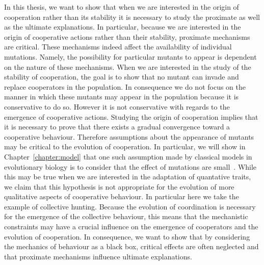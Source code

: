     In this thesis, we want to show that when we are interested in the origin of cooperation rather than its stability it is necessary to study the proximate as well as the ultimate explanations. In particular, because we are interested in the origin of cooperative actions rather than their stability, proximate mechanisms are critical. These mechanisms indeed affect the availability of individual mutations. Namely, the possibility for particular mutants to appear is dependent on the nature of these mechanisms. When we are interested in the study of the stability of cooperation, the goal is to show that no mutant can invade and replace cooperators in the population. In consequence we do not focus on the manner in which these mutants may appear in the population because it is conservative to do so. However it is not conservative with regards to the emergence of cooperative actions. Studying the origin of cooperation implies that it is necessary to prove that there exists a gradual convergence toward a cooperative behaviour. Therefore assumptions about the appearance of mutants may be critical to the evolution of cooperation. In particular, we will show in Chapter~\ref{chapter:model} that one such assumption made by classical models in evolutionary biology is to consider that the effect of mutations are small~\parencite{Geritz1998, McGill2007}. While this may be true when we are interested in the adaptation of quantative traits, we claim that this hypothesis is not appropriate for the evolution of more qualitative aspects of cooperative behaviour. In particular here we take the example of collective hunting. Because the evolution of coordination is necessary for the emergence of the collective behaviour, this means that the mechanistic constraints may have a crucial influence on the emergence of cooperators and the evolution of cooperation. In consequence, we want to show that by considering the mechanics of behaviour as a black box, critical effects are often neglected and that proximate mechanisms influence ultimate explanations.



